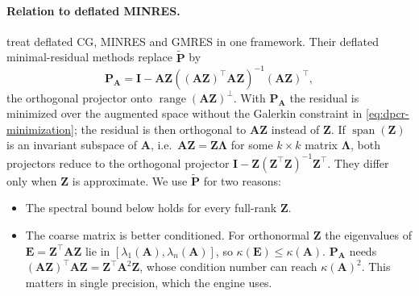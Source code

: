 \paragraph{Relation to deflated MINRES.}
\citet{gaul2013framework} treat deflated CG, MINRES and GMRES in one
framework. Their deflated minimal-residual methods replace
$\tilde{\mathbf{P}}$ by
\begin{equation}
  \mathbf{P}_{\mathbf{A}} = \mathbf{I} - \mathbf{A}\mathbf{Z}\left((\mathbf{A}\mathbf{Z})^\top\mathbf{A}\mathbf{Z}\right)^{-1}(\mathbf{A}\mathbf{Z})^\top ,
\end{equation}
the orthogonal projector onto $\operatorname{range}(\mathbf{A}\mathbf{Z})^\perp$.
With $\mathbf{P}_{\mathbf{A}}$ the residual is minimized over the augmented
space without the Galerkin constraint in \eqref{eq:dpcr-minimization}; the
residual is then orthogonal to $\mathbf{A}\mathbf{Z}$ instead of
$\mathbf{Z}$. If $\operatorname{span}(\mathbf{Z})$ is an invariant subspace
of $\mathbf{A}$, i.e.\ $\mathbf{A}\mathbf{Z} = \mathbf{Z}\boldsymbol{\Lambda}$
for some $k \times k$ matrix $\boldsymbol{\Lambda}$, both projectors reduce
to the orthogonal projector $\mathbf{I} - \mathbf{Z}(\mathbf{Z}^\top\mathbf{Z})^{-1}\mathbf{Z}^\top$.
They differ only when $\mathbf{Z}$ is approximate. We use
$\tilde{\mathbf{P}}$ for two reasons:
\begin{itemize}
  \item The spectral bound below holds for every full-rank $\mathbf{Z}$.
  \item The coarse matrix is better conditioned. For orthonormal $\mathbf{Z}$
    the eigenvalues of $\mathbf{E} = \mathbf{Z}^\top\mathbf{A}\mathbf{Z}$ lie in
    $[\lambda_1(\mathbf{A}), \lambda_n(\mathbf{A})]$, so
    $\kappa(\mathbf{E}) \le \kappa(\mathbf{A})$. $\mathbf{P}_{\mathbf{A}}$
    needs $(\mathbf{A}\mathbf{Z})^\top\mathbf{A}\mathbf{Z} = \mathbf{Z}^\top\mathbf{A}^2\mathbf{Z}$,
    whose condition number can reach $\kappa(\mathbf{A})^2$. This matters in
    single precision, which the engine uses.
\end{itemize}

